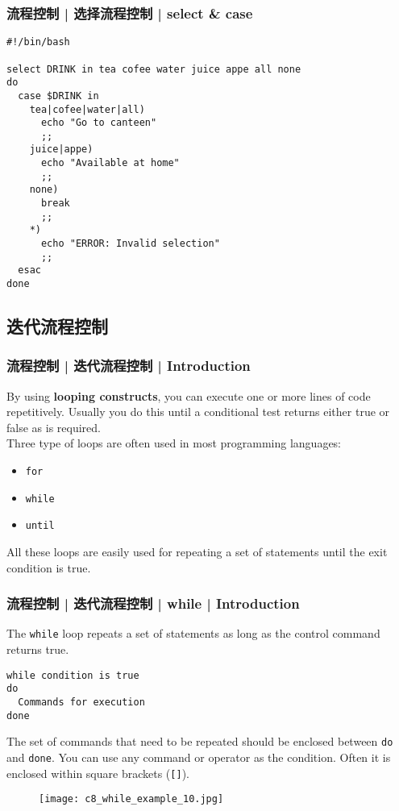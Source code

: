\begin{frame}[fragile]
  \frametitle{流程控制 | 选择流程控制 | \alert{select \& case}}
\begin{lstlisting}[basicstyle=\footnotesize\tt]
#!/bin/bash

select DRINK in tea cofee water juice appe all none
do
  case $DRINK in
    tea|cofee|water|all)
      echo "Go to canteen"
      ;;
    juice|appe)
      echo "Available at home"
      ;;
    none)
      break
      ;;
    *)
      echo "ERROR: Invalid selection"
      ;;
  esac
done
\end{lstlisting}
\end{frame}

\subsection{迭代流程控制}
\begin{frame}[fragile]
  \frametitle{流程控制 | 迭代流程控制 | Introduction}
  By using \textbf{looping constructs}, you can execute one or more
  lines of code repetitively. Usually you do this until a conditional
  test returns either true or false as is required.\\
  \vspace{0.3cm}
  Three type of loops are often used in most programming languages:
  \begin{itemize}
    \item \verb|for|
    \item \verb|while|
    \item \verb|until|
  \end{itemize}
  All these loops are easily used for repeating a set of statements until the exit condition is true.
\end{frame}

\begin{frame}[fragile]
  \frametitle{流程控制 | 迭代流程控制 | while | Introduction}
  The \verb|while| loop repeats a set of statements as long as the control command returns true.\\
  \vspace{-0.2cm}
\begin{lstlisting}
while condition is true
do
  Commands for execution
done
\end{lstlisting}
  \vspace{-0.1cm}
  The set of commands that need to be repeated should be enclosed between \verb|do| and \verb|done|. You can use any command or operator as the condition.  Often it is enclosed within square brackets (\verb|[]|).\\
  \vspace{-0.2cm}
  \begin{figure}
    \centering
    \texttt{[image: c8\_while\_example\_10.jpg]}
  \end{figure}
\end{frame}

